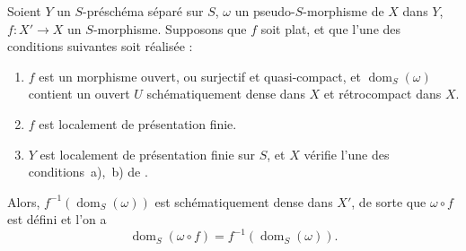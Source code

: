 \begin{proposition}[20.3.11]
\label{IV.20.3.11}
Soient $Y$ un $S$-préschéma séparé sur $S$, $\omega$ un pseudo-$S$-morphisme de $X$ dans $Y$, $f:X'\to X$ un $S$-morphisme.
Supposons que $f$ soit plat, et que l'une des conditions suivantes soit réalisée :
\begin{enumerate}[label=\emph{(\roman*)}]
  \item $f$ est un morphisme ouvert, ou surjectif et quasi-compact, et $\operatorname{dom}_S(\omega)$ contient un ouvert $U$ schématiquement dense dans $X$ et rétrocompact dans $X$.
  \item $f$ est localement de présentation finie.
  \item $Y$ est localement de présentation finie sur $S$, et $X$ vérifie l'une des conditions~a),~b) de .
\end{enumerate}
Alors, $f^{-1}(\operatorname{dom}_S(\omega))$ est schématiquement dense dans $X'$, de sorte que $\omega\circ f$ est défini  et l'on a
\[
\label{IV.20.3.11.1}
  \operatorname{dom}_S(\omega\circ f)=f^{-1}(\operatorname{dom}_S(\omega)).
  \tag{20.3.11.1}
\]
\end{proposition}

